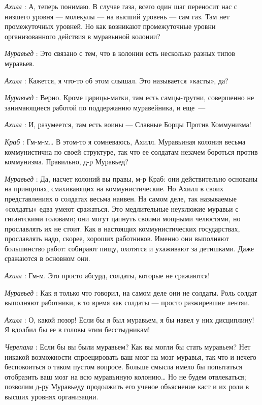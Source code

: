 \documentclass[../main.tex]{subfiles}
\begin{document}
\begin{dialogue}
\emph{Ахилл} : А, теперь понимаю. В случае газа, всего один шаг переносит нас с низшего уровня --- молекулы --- на высший уровень --- сам газ. Там нет промежуточных уровней. Но как возникают промежуточные уровни организованного действия в муравьиной колонии?

\emph{Муравьед} : Это связано с тем, что в колонии есть несколько разных типов муравьев.

\emph{Ахилл} : Кажется, я что-то об этом слышал. Это называется «касты», да?

\emph{Муравьед} : Верно. Кроме царицы-матки, там есть самцы-трутни, совершенно не занимающиеся работой по поддержанию муравейника, и еще~---

\emph{Ахилл} : И, разумеется, там есть воины --- Славные Борцы Против Коммунизма!

\emph{Краб} : Гм-м-м\ldots{} В этом-то я сомневаюсь, Ахилл. Муравьиная колония весьма коммунистична по своей структуре, так что ее солдатам незачем бороться против коммунизма. Правильно, д-р Муравьед?

\emph{Муравьед} : Да, насчет колоний вы правы, м-р Краб: они действительно основаны на принципах, смахивающих на коммунистические. Но Ахилл в своих представлениях о солдатах весьма наивен. На самом деле, так называемые «солдаты» едва умеют сражаться. Это медлительные неуклюжие муравьи с гигантскими головами; они могут цапнуть своими мощными челюстями, но прославлять их не стоит. Как в настоящих коммунистических государствах, прославлять надо, скорее, хороших работников. Именно они выполняют большинство работ: собирают пищу, охотятся и ухаживают за детишками. Даже сражаются в основном они.

\emph{Ахилл} : Гм-м. Это просто абсурд, солдаты, которые не сражаются!

\emph{Муравьед} : Как я только что говорил, на самом деле они не солдаты. Роль солдат выполняют работники, в то время как солдаты --- просто разжиревшие лентяи.

\emph{Ахилл} : О, какой позор! Если бы я был муравьем, я бы навел у них дисциплину! Я вдолбил бы ее в головы этим бесстыдникам!

\emph{Черепаха} : Если бы вы были муравьем? Как вы могли бы стать муравьем? Нет никакой возможности спроецировать ваш мозг на мозг муравья, так что и нечего беспокоиться о таком пустом вопросе. Больше смысла имело бы попытаться отобразить ваш мозг на всю муравьиную колонию\ldots{} Но не будем отвлекаться; позволим д-ру Муравьеду продолжить его ученое объяснение каст и их роли в высших уровнях организации.


\end{dialogue}
\end{document}
